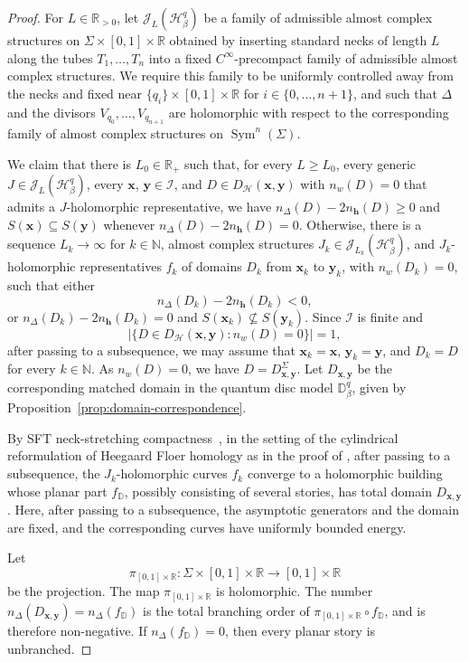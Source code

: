 \documentclass[11pt]{amsart}
\numberwithin{equation}{section}
\numberwithin{figure}{section}
\theoremstyle{definition}
\newcommand{\cH}{\mathcal{H}}
\newcommand{\cI}{\mathcal{I}}
\newcommand{\cJ}{\mathscr{J}}
\newcommand{\bD}{\mathbb{D}}
\newcommand{\bN}{\mathbb{N}}
\newcommand{\bR}{\mathbb{R}}
\DeclareMathOperator{\Sym}{Sym}
\newcommand{\hs}{\boldsymbol{h}}
\newcommand{\xs}{\boldsymbol{x}}
\newcommand{\ys}{\boldsymbol{y}}
\begin{document}
\begin{proof}
    For $L \in \bR_{>0}$, let $\cJ_L(\cH^q_\beta)$ be a family of admissible almost complex structures on $\Sigma \times [0,1] \times \bR$ obtained by inserting standard necks of length $L$ along the tubes $T_1,\dots,T_n$ into a fixed $C^\infty$-precompact family of admissible almost complex structures. We require this family to be uniformly controlled away from the necks and fixed near $\{q_i\} \times [0,1] \times \bR$ for $i \in \{0,\dots,n+1\}$, and such that $\Delta$ and the divisors $V_{q_0},\dots,V_{q_{n+1}}$ are holomorphic with respect to the corresponding family of almost complex structures on $\Sym^n(\Sigma)$.

    We claim that there is $L_0 \in \bR_+$ such that, for every $L \ge L_0$, every generic $J \in \cJ_L(\cH^q_\beta)$, every $\xs$, $\ys \in \cI$, and $D \in D_{\cH}(\xs,\ys)$ with $n_w(D) = 0$ that admits a $J$-holomorphic representative, we have $n_{\Delta}(D) - 2n_{\hs}(D) \ge 0$ and $S(\xs) \subseteq S(\ys)$ whenever $n_{\Delta}(D) - 2n_{\hs}(D) = 0$. Otherwise, there is a sequence $L_k \to \infty$ for $k \in \bN$, almost complex structures $J_k \in \cJ_{L_k}(\cH^q_\beta)$, and $J_k$-holomorphic representatives $f_k$ of domains $D_k$ from $\xs_k$ to $\ys_k$, with $n_w(D_k) = 0$, such that either
    \[
    n_\Delta(D_k) - 2n_{\hs}(D_k) < 0,
    \]
    or $n_{\Delta}(D_k) - 2n_{\hs}(D_k) = 0$ and $S(\xs_k) \nsubseteq S(\ys_k)$. Since $\cI$ is finite and 
    \[
    |\{D \in D_{\cH}(\xs,\ys) : n_w(D) = 0\}| = 1, 
    \]
    after passing to a subsequence, we may assume that $\xs_k = \xs$, $\ys_k = \ys$, and $D_k = D$ for every $k \in \bN$. As $n_w(D) = 0$, we have $D = D^\Sigma_{\xs,\ys}$. Let $D_{\xs,\ys}$ be the corresponding matched domain in the quantum disc model $\bD^q_\beta$, given by Proposition~\ref{prop:domain-correspondence}.

    By SFT neck-stretching compactness~\cite[Theorems~10.3 and 10.6]{SFT}, in the setting of the cylindrical reformulation of Heegaard Floer homology as in the proof of \cite[Proposition~12.4]{Lipshitz}, after passing to a subsequence, the $J_k$-holomorphic curves $f_k$ converge to a holomorphic building whose planar part $f_{\bD}$, possibly consisting of several stories, has total domain $D_{\xs,\ys}$. Here, after passing to a subsequence, the asymptotic generators and the domain are fixed, and the corresponding curves have uniformly bounded energy.

    Let 
    \[
    \pi_{[0,1] \times \bR} \colon \Sigma \times [0,1] \times \bR \to [0,1] \times \bR 
    \]
    be the projection. The map $\pi_{[0,1] \times \bR}$ is holomorphic. The number $n_\Delta(D_{\xs,\ys}) = n_\Delta(f_{\bD})$ is the total branching order of $\pi_{[0,1] \times \bR} \circ f_{\bD}$, and is therefore non-negative. If $n_\Delta(f_{\bD}) = 0$, then every planar story is unbranched.
    

\end{proof}
\end{document}
